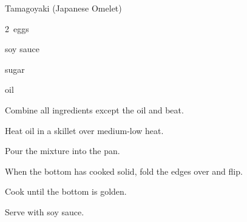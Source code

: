 \begin{recipe}{Tamagoyaki (Japanese Omelet)}{}{}

\begin{description}
\item 2~eggs
\item {} soy sauce
\item {} sugar
\item oil
\end{description}

\begin{directions}
\item Combine all ingredients except the oil and beat.
\item Heat oil in a skillet over medium-low heat.
\item Pour the mixture into the pan.
\item When the bottom has cooked solid, fold the edges over and flip.
\item Cook until the bottom is golden.
\item Serve with soy sauce.
\end{directions}

\end{recipe}
